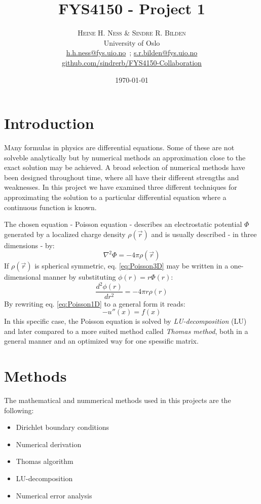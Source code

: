 \documentclass[twoside,twocolumn]{article}
\title{FYS4150 - Project 1} %
\author{%
\textsc{Heine H. Ness \& Sindre R. Bilden} \\[1ex] %
\normalsize University of Oslo \\ %
\normalsize \href{mailto:h.h.ness@fys.uio.no}{h.h.ness@fys.uio.no}\ ; \href{mailto:s.r.bilden@fys.uio.no}{s.r.bilden@fys.uio.no}\\%
\normalsize \href{https://github.com/sindrerb/FYS4150-Collaboration/tree/master/Doc/Project1}{github.com/sindrerb/FYS4150-Collaboration}
}
\date{\today} %
\newcommand{\nl}{

\medskip
\noindent
}
\begin{document}
\maketitle


\section{Introduction}

\lettrine[nindent=0em,lines=3]{M}any formulas in physics are differential equations. Some of these are not solveble analytically but by numerical methods an approximation close to the exact solution may be achieved. A broad selection of  numerical methods have been designed throughout time, where all have their different strengths and weaknesses.
In this project we have examined three different techniques for approximating the solution to a particular differential equation where a continuous function is known.\nl 

The chosen equation - Poisson equation - describes an electrostatic potential $\Phi$ generated by a localized charge density $\rho(\vec{r})$ and is usually described - in three dimensions - by:
\begin{equation}
\nabla^2\Phi = -4\pi \rho(\vec{r}) \label{eq:Poisson3D}
\end{equation}
If $\rho(\vec{r})$ is spherical symmetric, eq. \ref{eq:Poisson3D} may be written in a one-dimensional manner by substituting $\phi(r)=r\Phi(r)$:
\begin{equation}
\frac{d^2\phi(r)}{dr^2}=-4\pi r\rho(r) \label{eq:Poisson1D}
\end{equation}
By rewriting eq. \ref{eq:Poisson1D} to a general form it reads:
\begin{equation}
-u''(x)=f(x) \label{eq:general}
\end{equation}
In this specific case, the Poisson equation is solved by \textit{LU-decomposition} (LU) and later compared to a more suited method called \textit{Thomas method}, both in a general manner and an optimized way for one spessific matrix.

\section{Methods}
The mathematical and nummerical methods used in this projects are the following:
\begin{itemize}
\item Dirichlet boundary conditions
\item Numerical derivation
\item Thomas algorithm
\item LU-decomposition
\item Numerical error analysis
\end{itemize}
\end{document}
